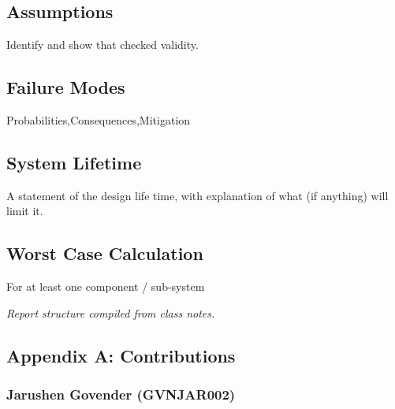 \subsection{Assumptions}
Identify and show that checked validity.
\subsection{Failure Modes}
Probabilities,Consequences,Mitigation
\subsection{System Lifetime}
A statement of the design life time, with explanation of what (if anything) will limit it.
\subsection{Worst Case Calculation}
For at least one component / sub-system 

\textit{Report structure compiled from class notes.}\cite{handout}\cite{notes}



\newpage





\newpage
\vspace*{\fill}
\begin{center}
\subsection*{Appendix A: Contributions}
\end{center}
\vspace*{\fill}

\newpage
\subsubsection*{Jarushen Govender (GVNJAR002)}
